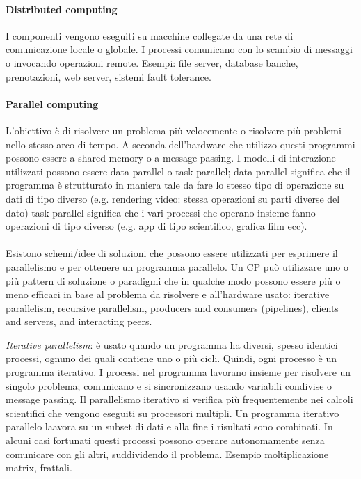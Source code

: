 \documentclass[10pt,a4paper]{article}
\begin{document}
\paragraph{Distributed computing} I componenti vengono eseguiti su macchine collegate da una rete di comunicazione locale o globale. I processi comunicano con lo scambio di messaggi o invocando operazioni remote.
Esempi: file server, database banche, prenotazioni, web server, sistemi fault tolerance.

\paragraph{Parallel computing} L'obiettivo è di risolvere un problema più velocemente o risolvere più problemi nello stesso arco di tempo. A seconda dell'hardware che utilizzo questi programmi possono essere a shared memory o a message passing. I modelli di interazione utilizzati possono essere data parallel o task parallel;
data parallel significa che il programma è strutturato in maniera tale da fare lo stesso tipo di operazione su dati di tipo diverso (e.g. rendering video: stessa operazioni su parti diverse del dato)
task parallel significa che i vari processi che operano insieme fanno operazioni di tipo diverso (e.g. app di tipo scientifico, grafica film ecc).
\\
\\
Esistono schemi/idee di soluzioni che possono essere utilizzati per esprimere il parallelismo e per ottenere un programma parallelo. Un CP può utilizzare uno o più pattern di soluzione o paradigmi che in qualche modo possono essere più o meno efficaci in base al problema da risolvere e all'hardware usato: iterative parallelism, recursive parallelism, producers and consumers (pipelines), clients and servers, and interacting peers.

\textit{Iterative parallelism}: è usato quando un programma ha diversi, spesso identici processi, ognuno dei quali contiene uno o più cicli. Quindi, ogni processo è un programma iterativo. I processi nel programma lavorano insieme per risolvere un singolo problema; comunicano e si sincronizzano usando variabili condivise o message passing. Il parallelismo iterativo si verifica più frequentemente nei calcoli scientifici che vengono eseguiti su processori multipli.
Un programma iterativo parallelo laavora su un subset di dati e alla fine i risultati sono combinati.
In alcuni casi fortunati questi processi possono operare autonomamente senza comunicare con gli altri, suddividendo il problema. Esempio moltiplicazione matrix, frattali.
\end{document}
